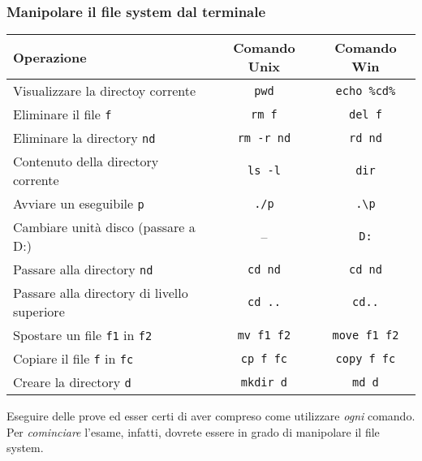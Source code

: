 \documentclass{beamer}
\begin{document}
\begin{frame}[fragile]
\label{slide:commands}
\frametitle{Manipolare il file system dal terminale}
\begin{center}
  \begin{tabular}{| l | c | c |}
    \hline
    \textbf{Operazione} & \textbf{Comando Unix} & \textbf{Comando Win} \\ \hline
    \scriptsize{}Visualizzare la directoy corrente & \texttt{pwd} & \texttt{echo \%cd\%}  \\ \hline
    \scriptsize{}Eliminare il file \texttt{f} & \texttt{rm f} & \texttt{del f} \\ \hline
    \scriptsize{}Eliminare la directory \texttt{nd} & \texttt{rm -r nd} & \texttt{rd nd} \\ \hline
    \scriptsize{}Contenuto della directory corrente & \texttt{ls -l} & \texttt{dir} \\ \hline
    \scriptsize{}Avviare un eseguibile \texttt{p} & \texttt{./p} & \texttt{.\textbackslash{}p} \\ \hline
    \scriptsize{}Cambiare unità disco (passare a D:) & -- & \texttt{D:} \\ \hline
    \scriptsize{}Passare alla directory \texttt{nd} & \texttt{cd nd} & \texttt{cd nd} \\ \hline
    \scriptsize{}Passare alla directory di livello superiore & \texttt{cd ..} & \texttt{cd..} \\ \hline
    \scriptsize{}Spostare un file \texttt{f1} in \texttt{f2} & \texttt{mv f1 f2} & \texttt{move f1 f2} \\ \hline
    \scriptsize{}Copiare il file \texttt{f} in \texttt{fc} & \texttt{cp f fc} & \texttt{copy f fc} \\ \hline
    \scriptsize{}Creare la directory \texttt{d} & \texttt{mkdir d} & \texttt{md d} \\ \hline
  \end{tabular}
\end{center}
Eseguire delle prove ed esser certi di aver compreso come utilizzare \emph{ogni} comando. Per \emph{cominciare} l'esame, infatti, dovrete essere in grado di manipolare il file system.
\end{frame}
\end{document}
